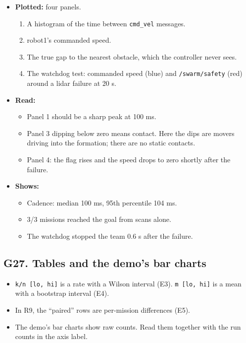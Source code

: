 \documentclass[
  10.5pt,
  a4paper,
]{article}
\providecommand{\tightlist}{%
  \setlength{\itemsep}{0pt}\setlength{\parskip}{0pt}}
\begin{document}
\begin{itemize}
\tightlist
\item
  \textbf{Plotted:} four panels.

  \begin{enumerate}
  \def\labelenumi{\arabic{enumi}.}
  \tightlist
  \item
    A histogram of the time between \texttt{cmd\_vel} messages.
  \item
    robot1's commanded speed.
  \item
    The true gap to the nearest obstacle, which the controller never
    sees.
  \item
    The watchdog test: commanded speed (blue) and \texttt{/swarm/safety}
    (red) around a lidar failure at 20 s.
  \end{enumerate}
\item
  \textbf{Read:}

  \begin{itemize}
  \tightlist
  \item
    Panel 1 should be a sharp peak at 100 ms.
  \item
    Panel 3 dipping below zero means contact. Here the dips are movers
    driving into the formation; there are no static contacts.
  \item
    Panel 4: the flag rises and the speed drops to zero shortly after
    the failure.
  \end{itemize}
\item
  \textbf{Shows:}

  \begin{itemize}
  \tightlist
  \item
    Cadence: median 100 ms, 95th percentile 104 ms.
  \item
    3/3 missions reached the goal from scans alone.
  \item
    The watchdog stopped the team 0.6 s after the failure.
  \end{itemize}
\end{itemize}

\hypertarget{g27.-tables-and-the-demos-bar-charts}{%
\subsection{G27. Tables and the demo's bar
charts}\label{g27.-tables-and-the-demos-bar-charts}}

\begin{itemize}
\tightlist
\item
  \texttt{k/n\ {[}lo,\ hi{]}} is a rate with a Wilson interval (E3).
  \texttt{m\ {[}lo,\ hi{]}} is a mean with a bootstrap interval (E4).
\item
  In R9, the ``paired'' rows are per-mission differences (E5).
\item
  The demo's bar charts show raw counts. Read them together with the run
  counts in the axis label.
\end{itemize}
\end{document}
